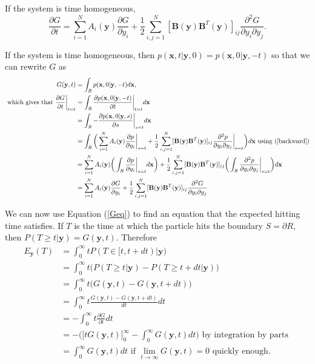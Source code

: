 \documentclass{article}
\newcommand{\mb}{\mathbf}
\begin{document}
\begin{claim} If the system is time homogeneous,
\begin{equation}
\frac{\partial G}{\partial t}=\sum_{i=1}^NA_i({\mb y})\frac{\partial G}{\partial y_i}+\frac{1}{2}\sum_{i,j=1}^N[{\mb B}({\mb y}){\mb B}^T({\mb y})]_{ij}\frac{\partial^2 G}{\partial y_i\partial y_j}. \label{Geq}
\end{equation}
\end{claim}
\begin{pf}
If the system is time homogeneous, then $p({\mb x},t|{\mb y},0)=p({\mb x},0|{\mb y},-t)$ so that we can rewrite $G$ as 
\begin{align*}
G({\mb y},t)&=\int_Rp({\mb x},0|{\mb y},-t)d{\mb x},
\\ \text{ which gives that } \frac{\partial G}{\partial t}\bigg|_{t=t}&=\int_R\frac{\partial p({\mb x},0|{\mb y},-t)}{\partial t}\bigg|_{t=t}d{\mb x}
\\&=\int_R -\frac{\partial p({\mb x},0|{\mb y},s)}{\partial s}\bigg|_{s=t} d{\mb x}
\\&=\int_R\bigg(\sum_{i=1}^NA_i({\mb y})\frac{\partial p}{\partial y_{i}}\bigg|_{s=t}+\frac{1}{2}\sum_{i,j=1}^N[{\mb B}({\mb y}){\mb B}^T({\mb y})]_{ij}\frac{\partial^2 p}{\partial y_{i}\partial y_{j}}\bigg|_{s=t}\bigg) d{\mb x} \text{ using (\ref{backward})}
\\&=\sum_{i=1}^NA_i({\mb y})\bigg(\int_R\frac{\partial p}{\partial y_{i}}\bigg|_{s=t}d{\mb x}\bigg)+\frac{1}{2}\sum_{i,j=1}^N[{\mb B}({\mb y}){\mb B}^T({\mb y})]_{ij}\bigg(\int_R\frac{\partial^2 p}{\partial y_{i}\partial y_{j}}\bigg|_{s=t}\bigg) d{\mb x}
\\&=\sum_{i=1}^NA_i({\mb y})\frac{\partial G}{\partial y_i}+\frac{1}{2}\sum_{i,j=1}^N[{\mb B}({\mb y}){\mb B}^T({\mb y})]_{ij}\frac{\partial^2 G}{\partial y_i\partial y_j}
\end{align*}
\end{pf}

We can now use Equation (\ref{Geq}) to find an equation that the expected hitting time satisfies. If $T$ is the time at which the particle hits the boundary $S=\partial R$, then $P(T\geq t|{\mb y})=G({\mathbf y},t)$.  Therefore
\begin{align*}
E_{{\mathbf y}}(T) &=\int_0^\infty t P(T\in[t,t+dt)|{\mathbf y})
\\&= \int_0^\infty t \bigg(P(T\geq t|{\mathbf y})-P(T\geq t+dt|{\mathbf y})\bigg) 
\\&=\int_0^\infty t \bigg(G({\mathbf y},t)-G({\mathbf y},t+dt)\bigg)
\\&=\int_0^\infty t \frac{G({\mathbf y},t)-G({\mathbf y},t+dt)}{dt}dt
\\&=-\int_0^\infty t\frac{\partial G}{\partial t}dt
\\&=-\bigg(\big[tG({\mathbf y},t)\big]_0^{\infty}-\int_0^\infty G({\mathbf y},t)dt\bigg)  \text{ by integration by parts }
\\&=\int_0^\infty G({\mathbf y},t)dt \text{ if $\lim_{t\to \infty}G({\mathbf y},t)=0$ quickly enough}.
\end{align*}
\end{document}
